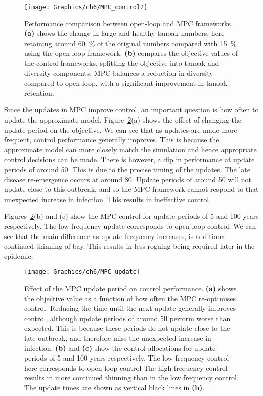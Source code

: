 \begin{figure}[t]
    \begin{center}
        \texttt{[image: Graphics/ch6/MPC\_control2]}
        \caption[MPC strategy performance]{Performance comparison between open-loop and MPC frameworks. \textbf{(a)} shows the change in large and healthy tanoak numbers, here retaining around \SI{60}{\percent} of the original numbers compared with \SI{15}{\percent} using the open-loop framework. \textbf{(b)} compares the objective values of the control frameworks, splitting the objective into tanoak and diversity components. MPC balances a reduction in diversity compared to open-loop, with a significant improvement in tanoak retention.\label{fig:ch6:mpc_performance}}
    \end{center}
\end{figure}

Since the updates in MPC improve control, an important question is how often to update the approximate model. Figure~\ref{fig:ch6:mpc_update}(a) shows the effect of changing the update period on the objective. We can see that as updates are made more frequent, control performance generally improves. This is because the approximate model can more closely match the simulation and hence appropriate control decisions can be made. There is however, a dip in performance at update periods of around \SI{50}{\years}. This is due to the precise timing of the updates. The late disease re-emergence occurs at around \SI{80}{\years}. Update periods of around \SI{50}{\years} will not update close to this outbreak, and so the MPC framework cannot respond to that unexpected increase in infection. This results in ineffective control.

Figures~\ref{fig:ch6:mpc_update}(b) and (c) show the MPC control for update periods of 5 and 100 years respectively. The low frequency update corresponds to open-loop control. We can see that the main difference as update frequency increases, is additional continued thinning of bay. This results in less roguing being required later in the epidemic.

\begin{figure}
    \begin{center}
        \texttt{[image: Graphics/ch6/MPC\_update]}
        \caption[Effect of MPC update period]{Effect of the MPC update period on control performance. \textbf{(a)} shows the objective value as a function of how often the MPC re-optimises control. Reducing the time until the next update generally improves control, although update periods of around \SI{50}{\years} perform worse than expected. This is because these periods do not update close to the late outbreak, and therefore miss the unexpected increase in infection. \textbf{(b)} and \textbf{(c)} show the control allocations for update periods of 5 and 100 years respectively. The low frequency control here corresponds to open-loop control The high frequency control results in more continued thinning than in the low frequency control. The update times are shown as vertical black lines in \textbf{(b)}.\label{fig:ch6:mpc_update}}
    \end{center}
\end{figure}

